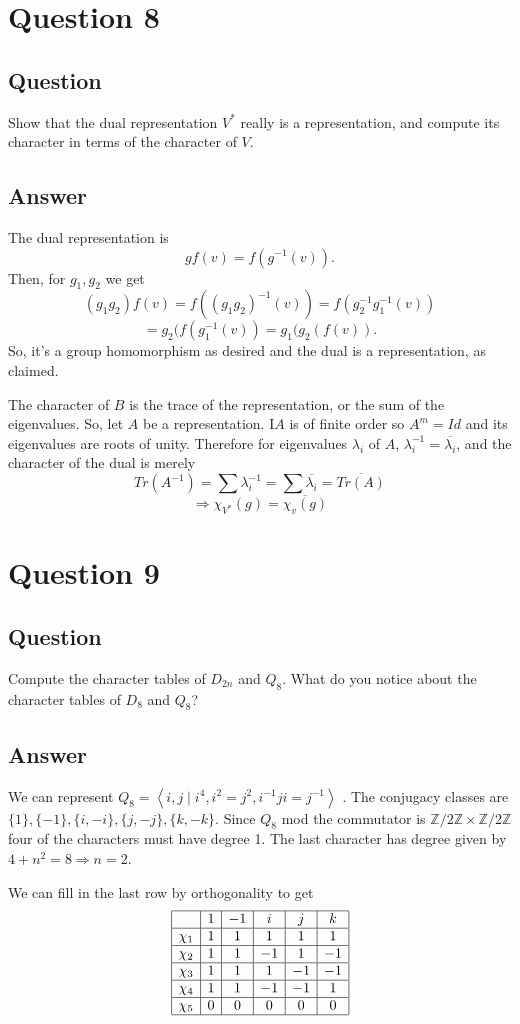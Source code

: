 \documentclass[11pt]{article}
\begin{document}
\section{Question 8}
\subsection{Question}
Show that the dual representation $V^*$ really is a representation, and compute its character in terms of the character of $V$.
\subsection{Answer}
The dual representation is
\[g f(v) = f(g^{-1}(v)).\]
Then, for $g_1, g_2$  we get
\[(g_1g_2)f(v) = f((g_1g_2)^{-1}(v)) = f(g_2^{-1}g_1^{-1}(v))\]
\[=g_2(f(g^{-1}_1(v)) = g_1(g_2(f(v)).\]
So, it's a group homomorphism as desired and the dual is a representation, as claimed. 

The character of $B$ is the trace of the representation, or the sum of the eigenvalues. So, let $A$ be a representation. I$A$ is of finite order so $A^m = Id$ and its eigenvalues are roots of unity. Therefore for eigenvalues $\lambda_i$ of $A$, $\lambda_i^{-1} = \overline{\lambda_i}$, and the character of the dual is merely
\[Tr(A^{-1}) = \sum \lambda_i^{-1} = \sum \overline{\lambda_i} = \overline{Tr(A)}\]
\[\Rightarrow \chi_{V^*}(g) = \overline{\chi_v(g)}\]

\section{Question 9}
\subsection{Question}
Compute the character tables of $D_{2n}$ and $Q_8$. What do you notice about the character tables of $D_8$ and $Q_8$?
\subsection{Answer}
We can represent $Q_8 = \left< i,j \mid i^4, i^2 = j^2, i^{-1}ji = j^{-1}\right>$ . The conjugacy classes are $\{1\}, \{-1\}, \{i, -i\},\{j,-j\}, \{k,-k\}$. Since $Q_8$ mod the commutator is $\mathbb{Z}/2\mathbb{Z} \times \mathbb{Z} / 2 \mathbb{Z}$ four of the characters must have degree 1. The last character has degree given by $4+ n^2 = 8 \Rightarrow n = 2$.

We can fill in the last row by orthogonality to get
\[\begin{array}{|c|c|c|c|c|c|}
\hline
&1&-1&i&j&k\\
\hline
\chi_1&1&1&1&1&1\\
\hline
\chi_2&1&1&-1&1&-1\\
\hline
\chi_3&1&1&1&-1&-1\\
\hline
\chi_4&1&1&-1&-1&1\\
\hline
\chi_5&0&0&0&0&0\\
\hline
\end{array}\]
\end{document}
